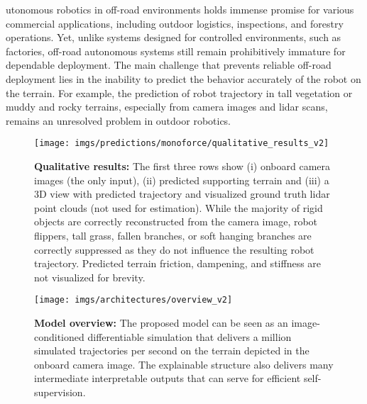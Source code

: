 utonomous robotics in off-road environments holds immense promise for various commercial applications,
including outdoor logistics, inspections,
and forestry operations.
Yet, unlike systems designed for controlled environments, such as factories, off-road autonomous systems still remain
prohibitively immature for dependable deployment.
The main challenge that prevents reliable off-road deployment lies in the inability to predict the behavior accurately
of the robot on the terrain.
For example, the prediction of robot trajectory in tall vegetation or muddy and rocky terrains,
especially from camera images and lidar scans, remains an unresolved problem in outdoor robotics.

\begin{figure}[t!]
  \centering
  \texttt{[image: imgs/predictions/monoforce/qualitative\_results\_v2]}
  \caption{\textbf{Qualitative results:} The first three rows show (i) onboard camera images (the only input), (ii) predicted supporting terrain and (iii) a 3D view with predicted trajectory and visualized ground truth lidar point clouds (not used for estimation). While the majority of rigid objects are correctly reconstructed from the camera image, robot flippers, tall grass, fallen branches, or soft hanging branches are correctly suppressed as they do not influence the resulting robot trajectory. Predicted terrain friction, dampening, and stiffness are not visualized for brevity.
  }
  \label{fig:catch-eye}
\end{figure}


\begin{figure*}[t!]
  \centering
  \texttt{[image: imgs/architectures/overview\_v2]}
  \caption{
  \textbf{Model overview:} The proposed model can be seen as an image-conditioned differentiable simulation that delivers a million simulated trajectories per second on the terrain depicted in the onboard camera image. The explainable structure also delivers many intermediate interpretable outputs that can serve for efficient self-supervision.}
  \label{fig:model_overview}
\end{figure*}

